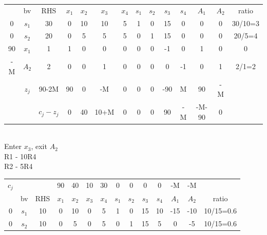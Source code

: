 \documentclass[answers]{exam}
\begin{document}
\begin{questions}
\begin{solution}
\begin{parts}
\begin{tabular}{cccccccccccccc}
		\multicolumn{1}{c|}{}   & \multicolumn{1}{c|}{bv}    & \multicolumn{1}{c|}{RHS}       & $x_1$ & $x_2$ & $x_3$ & $x_4$ & $s_1$ & $s_2$ & $s_3$ & $s_4$ & $A_1$ & $A_2$ & ratio   \\ \cline{1-13}
		\multicolumn{1}{c|}{0}  & \multicolumn{1}{c|}{$s_1$} & \multicolumn{1}{c|}{30}        & 0     & 10    & 10    & 5     & 1     & 0     & 15    & 0     & 0     & 0     & 30/10=3 \\
		\multicolumn{1}{c|}{0}  & \multicolumn{1}{c|}{$s_2$} & \multicolumn{1}{c|}{20}        & 0     & 5     & 5     & 5     & 0     & 1     & 15    & 0     & 0     & 0     & 20/5=4  \\
		\multicolumn{1}{c|}{90} & \multicolumn{1}{c|}{$x_1$} & \multicolumn{1}{c|}{1}         & 1     & 0     & 0     & 0     & 0     & 0     & -1    & 0     & 1     & 0     & 0       \\
		\multicolumn{1}{c|}{-M} & \multicolumn{1}{c|}{$A_2$} & \multicolumn{1}{c|}{2}         & 0     & 0     & 1     & 0     & 0     & 0     & 0     & -1    & 0     & 1     & 2/1=2   \\ \cline{1-13}
		& \multicolumn{1}{c|}{$z_j$} & \multicolumn{1}{c|}{90-2M}     & 90    & 0     & -M    & 0     & 0     & 0     & -90   & M     & 90    & -M    &         \\ \cline{3-13}
		&                            & \multicolumn{1}{c|}{$c_j-z_j$} & 0     & 40    & 10+M  & 0     & 0     & 0     & 90    & -M    & -M-90 & 0     &        
	\end{tabular} \\
	Enter $x_3$, exit $A_2$ \\
	R1 - 10R4 \\
	R2 - 5R4 \\
	\begin{tabular}{cccccccccccccc}
		$c_j$                   &                            &                                & 90    & 40    & 10    & 30    & 0     & 0     & 0     & 0     & -M    & -M    &           \\
		\multicolumn{1}{c|}{}   & \multicolumn{1}{c|}{bv}    & \multicolumn{1}{c|}{RHS}       & $x_1$ & $x_2$ & $x_3$ & $x_4$ & $s_1$ & $s_2$ & $s_3$ & $s_4$ & $A_1$ & $A_2$ & ratio     \\ \cline{1-13}
		\multicolumn{1}{c|}{0}  & \multicolumn{1}{c|}{$s_1$} & \multicolumn{1}{c|}{10}        & 0     & 10    & 0     & 5     & 1     & 0     & 15    & 10    & -15   & -10   & 10/15=0.6 \\
		\multicolumn{1}{c|}{0}  & \multicolumn{1}{c|}{$s_2$} & \multicolumn{1}{c|}{10}        & 0     & 5     & 0     & 5     & 0     & 1     & 15    & 5     & 0     & -5    & 10/15=0.6 \\

\end{tabular}
\end{parts}
\end{solution}
\end{questions}
\end{document}
